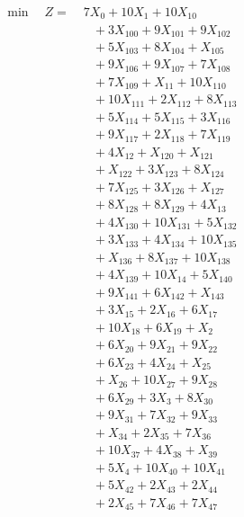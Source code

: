 \documentclass[a4paper,10pt]{article}
\begin{document}
\allowdisplaybreaks
{\small
\begin{align}
\min \quad Z = &\; 7X_{0} + 10X_{1} + 10X_{10} \\[0.5ex]
&\quad  + 3X_{100} + 9X_{101} + 9X_{102} \\[0.5ex]
&\quad  + 5X_{103} + 8X_{104} + X_{105} \\[0.5ex]
&\quad  + 9X_{106} + 9X_{107} + 7X_{108} \\[0.5ex]
&\quad  + 7X_{109} + X_{11} + 10X_{110} \\[0.5ex]
&\quad  + 10X_{111} + 2X_{112} + 8X_{113} \\[0.5ex]
&\quad  + 5X_{114} + 5X_{115} + 3X_{116} \\[0.5ex]
&\quad  + 9X_{117} + 2X_{118} + 7X_{119} \\[0.5ex]
&\quad  + 4X_{12} + X_{120} + X_{121} \\[0.5ex]
&\quad  + X_{122} + 3X_{123} + 8X_{124} \\[0.5ex]
&\quad  + 7X_{125} + 3X_{126} + X_{127} \\[0.5ex]
&\quad  + 8X_{128} + 8X_{129} + 4X_{13} \\[0.5ex]
&\quad  + 4X_{130} + 10X_{131} + 5X_{132} \\[0.5ex]
&\quad  + 3X_{133} + 4X_{134} + 10X_{135} \\[0.5ex]
&\quad  + X_{136} + 8X_{137} + 10X_{138} \\[0.5ex]
&\quad  + 4X_{139} + 10X_{14} + 5X_{140} \\[0.5ex]
&\quad  + 9X_{141} + 6X_{142} + X_{143} \\[0.5ex]
&\quad  + 3X_{15} + 2X_{16} + 6X_{17} \\[0.5ex]
&\quad  + 10X_{18} + 6X_{19} + X_{2} \\[0.5ex]
&\quad  + 6X_{20} + 9X_{21} + 9X_{22} \\[0.5ex]
&\quad  + 6X_{23} + 4X_{24} + X_{25} \\[0.5ex]
&\quad  + X_{26} + 10X_{27} + 9X_{28} \\[0.5ex]
&\quad  + 6X_{29} + 3X_{3} + 8X_{30} \\[0.5ex]
&\quad  + 9X_{31} + 7X_{32} + 9X_{33} \\[0.5ex]
&\quad  + X_{34} + 2X_{35} + 7X_{36} \\[0.5ex]
&\quad  + 10X_{37} + 4X_{38} + X_{39} \\[0.5ex]
&\quad  + 5X_{4} + 10X_{40} + 10X_{41} \\[0.5ex]
&\quad  + 5X_{42} + 2X_{43} + 2X_{44} \\[0.5ex]
&\quad  + 2X_{45} + 7X_{46} + 7X_{47} \\[0.5ex]

\end{align}}
\end{document}
